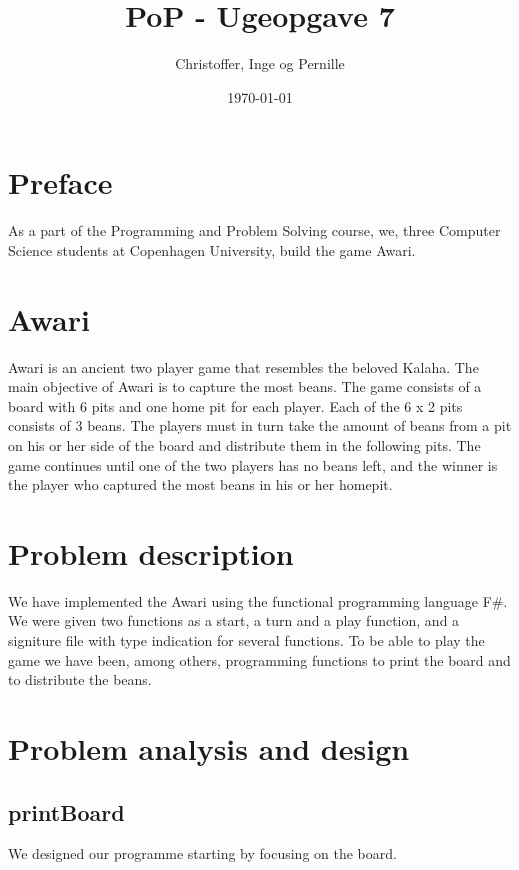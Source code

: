\documentclass[a4paper]{report}
\title{PoP - Ugeopgave 7}
\author{Christoffer, Inge og Pernille}
\date{\today}
\begin{document}
\maketitle

\section*{Preface}
As a part of the Programming and Problem Solving course, we,
three Computer Science students at Copenhagen University, build the game Awari.

\section*{Awari}
Awari is an ancient two player game that resembles the beloved Kalaha. The main
objective of Awari is to capture the most beans. The game consists of a board
with 6 pits and one home pit for each player. Each of the 6 x 2 pits consists of
3 beans. The players must in turn take the amount of beans from a pit on his or
her side of the board and distribute them in the following pits. The game
continues until one of the two players has no beans left, and the winner is the
player who captured the most beans in his or her homepit.

\section*{Problem description}
We have implemented the Awari using the functional programming language F\#. We
were given two functions as a start, a turn and a play function, and a signiture
file with type indication for several functions. To be able to play the game
we have been, among others, programming functions to print the board and to
distribute the beans.

\section*{Problem analysis and design}
\subsection*{printBoard}
We designed our programme starting by focusing on the board.






\lstset{language=FSharp}

\end{document}
